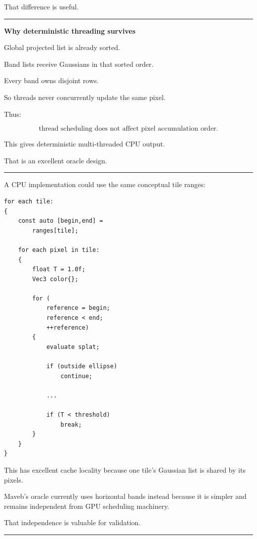 That difference is useful.

\begin{center}\rule{0.5\linewidth}{0.5pt}\end{center}

\textbf{Why deterministic threading survives}

Global projected list is already sorted.

Band lists receive Gaussians in that sorted order.

Every band owns disjoint rows.

So threads never concurrently update the same pixel.

Thus:

\[
\boxed{
\text{thread scheduling does not affect pixel accumulation order}.
}
\]

This gives deterministic multi-threaded CPU output.

That is an excellent oracle design.

\begin{center}\rule{0.5\linewidth}{0.5pt}\end{center}

A CPU implementation could use the same conceptual tile ranges:

\protect{}\label{tfx8be}%
\begin{verbatim}
for each tile:
{
    const auto [begin,end] =
        ranges[tile];

    for each pixel in tile:
    {
        float T = 1.0f;
        Vec3 color{};

        for (
            reference = begin;
            reference < end;
            ++reference)
        {
            evaluate splat;

            if (outside ellipse)
                continue;

            ...

            if (T < threshold)
                break;
        }
    }
}
\end{verbatim}

This has excellent cache locality because one tile's Gaussian list is shared by its pixels.

Maveb's oracle currently uses horizontal bands instead because it is simpler and remains independent from GPU scheduling machinery.

That independence is valuable for validation.

\begin{center}\rule{0.5\linewidth}{0.5pt}\end{center}

